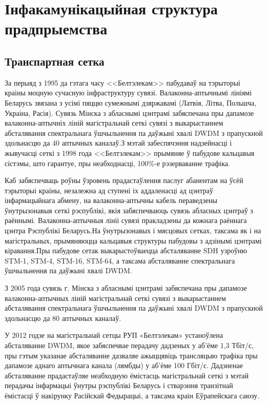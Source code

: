 \section{Інфакамунікацыйная структура прадпрыемства}

\subsection{Транспартная сетка}
За перыяд з 1995 да гэтага часу <<Белтэлекам>> пабудаваў на тэрыторыі краіны моцную сучасную інфраструктуру сувязі. Валаконна-аптычнымі лініямі Беларусь звязана з усімі пяццю сумежнымі дзяржавамі (Латвія, Літва, Польшча, Украіна, Расія). Сувязь Мінска з абласнымі цэнтрамі забяспечана пры дапамозе валаконна-аптычніх ліній магістральнай сеткі сувязі з выкарыстаннем абсталявання спектральнага ўшчыльнення па даўжыні хвалі DWDM з прапускной здольнасцю да 40 аптычных каналаў.З мэтай забеспячэння надзейнасці і жывучасці сеткі з 1998 года <<Белтэлекам>> прымяняе ў пабудове кальцавыя сістэмы, што гарантуе, пры неабходнасці, 100\%-е рэзерваванне трафіка.

Каб забяспечваць роўны ўзровень прадастаўлення паслуг абанентам на ўсёй тэрыторыі краіны, незалежна ад ступені іх аддаленасці ад цэнтраў інфармацыйнага абмену, на валаконна-аптычны кабель пераведзены ўнутрызонавыя сеткі рэспублікі, якія забяспечваюць сувязь абласных цэнтраў з раённымі. Валаконна-аптычныя лініі сувязі пракладзены да кожнага раённага цэнтра Рэспублікі Беларусь.На ўнутрызонавых і мясцовых сетках, таксама як і на магістральных, прымяняюцца кальцавыя структуры пабудовы з адзінымі цэнтрамі кіравання.Пры пабудове сетак выкарыстоўваецца абсталяванне SDH узроўню STM-1, STM-4, STM-16, STM-64, а таксама абсталяванне спектральнага ўшчыльнення па даўжыні хвалі DWDM.

З 2005 года сувязь г. Мінска з абласнымі цэнтрамі забяспечана пры дапамозе валаконна-аптычных ліній магістральнай сеткі сувязі з выкарыстаннем абсталявання спектральнага ўшчыльнення па даўжыні хвалі DWDM з прапускной здольнасцю да 80 аптычных каналаў.

У 2012 годзе на магістральнай сетцы РУП «Белтэлекам» устаноўлена абсталяванне DWDM, якое забяспечвае перадачу дадзеных у аб'ёме 1,3 Тбіт/с, пры гэтым указанае абсталяванне дазваляе ажыццявіць трансляцыю трафіка пры дапамозе аднаго аптычнага канала (лямбды) у аб'ёме 100 Гбіт/с. Дадзненае абсталяванне прадастаўляе неабходную ёмістасць магістральнай сеткі з мэтай перадачы інфармацыі ўнутры рэспублікі Беларусь і стварэння транзітнай ёмістасці ў накірунку Расійскай Федырацыі, а таксама краін Еўрапейскага саюзу.

